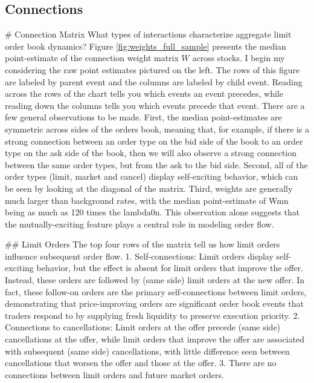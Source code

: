 	\subsection{Connections}
		\# Connection Matrix
		What types of interactions characterize aggregate limit order book dynamics? Figure \ref{fig:weights_full_sample} presents the median point-estimate of the connection weight matrix $W$ across stocks. I begin my considering the raw point estimates pictured on the left. The rows of this figure are labeled by parent event and the columns are labeled by child event. Reading across the rows of the chart tells you which events an event precedes, while reading down the columns tells you which events precede that event. There are a few general observations to be made. First, the median point-estimates are symmetric across sides of the orders book, meaning that, for example, if there is a strong connection between an order type on the bid side of the book to an order type on the ask side of the book, then we will also observe a strong connection between the same order types, but from the ask to the bid side. Second, all of the order types (limit, market and cancel) display self-exciting behavior, which can be seen by looking at the diagonal of the matrix. Third, weights are generally much larger than background rates, with the median point-estimate of Wmn being as much as 120 times the lambda0n. This observation alone suggests that the mutually-exciting feature plays a central role in modeling order flow.

		\#\# Limit Orders
		The top four rows of the matrix tell us how limit orders influence subsequent order flow.
		1. Self-connections: Limit orders display self-exciting behavior, but the effect is absent for limit orders that improve the offer. Instead, these orders are followed by (same side) limit orders at the new offer. In fact, these follow-on orders  are the primary self-connections between limit orders, demonstrating that price-improving orders are significant order book events that traders respond to by supplying fresh liquidity to preserve execution priority.
		2. Connections to cancellations: Limit orders at the offer precede (same side) cancellations at the offer, while limit orders that improve the offer are associated with subsequent (same side) cancellations, with little difference seen between cancellations that worsen the offer and those at the offer.
		3. There are no connections between limit orders and future market orders.

